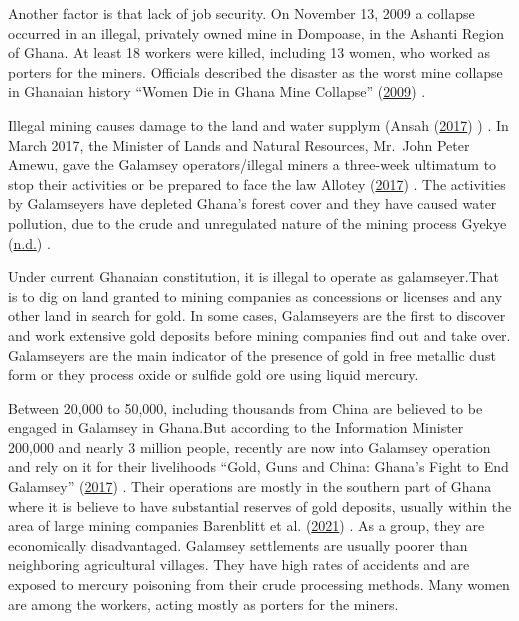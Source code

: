 \documentclass[12pt,a4paper]{book}
\begin{document}
{Another factor is that lack of job security. On November 13, 2009 a
collapse occurred in an illegal, privately owned mine in Dompoase, in
the Ashanti Region of Ghana. At least 18 workers were killed, including
13 women, who worked as porters for the miners. Officials described the
disaster as the worst mine collapse in Ghanaian history {``Women Die in
Ghana Mine Collapse''} (\protect\hyperlink{ref-womendi2009}{2009}) .

Illegal mining causes damage to the land and water supplym (Ansah
(\protect\hyperlink{ref-ansah2017}{2017}) ) . In March 2017, the
Minister of Lands and Natural Resources, Mr.~John Peter Amewu, gave the
Galamsey operators/illegal miners a three-week ultimatum to stop their
activities or be prepared to face the law Allotey
(\protect\hyperlink{ref-allotey2017}{2017}) . The activities by
Galamseyers have depleted Ghana's forest cover and they have caused
water pollution, due to the crude and unregulated nature of the mining
process Gyekye (\protect\hyperlink{ref-gyekye}{n.d.}) .

Under current Ghanaian constitution, it is illegal to operate as
galamseyer.That is to dig on land granted to mining companies as
concessions or licenses and any other land in search for gold. In some
cases, Galamseyers are the first to discover and work extensive gold
deposits before mining companies find out and take over. Galamseyers are
the main indicator of the presence of gold in free metallic dust form or
they process oxide or sulfide gold ore using liquid mercury.

Between 20,000 to 50,000, including thousands from China are believed to
be engaged in Galamsey in Ghana.But according to the Information
Minister 200,000 and nearly 3 million people, recently are now into
Galamsey operation and rely on it for their livelihoods {``Gold, Guns
and China: Ghana's Fight to End Galamsey''}
(\protect\hyperlink{ref-goldgu2017}{2017}) . Their operations are mostly
in the southern part of Ghana where it is believe to have substantial
reserves of gold deposits, usually within the area of large mining
companies Barenblitt et al.
(\protect\hyperlink{ref-barenblitt2021}{2021}) . As a group, they are
economically disadvantaged. Galamsey settlements are usually poorer than
neighboring agricultural villages. They have high rates of accidents and
are exposed to mercury poisoning from their crude processing methods.
Many women are among the workers, acting mostly as porters for the
miners.

\hypertarget{background-of-the-study}{%
}}
\end{document}
